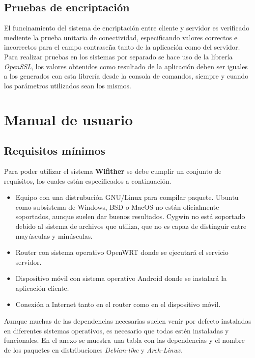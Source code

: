 \documentclass[12pt]{article}
\begin{document}
    \subsection{Pruebas de encriptación}
    El funcinamiento del sistema de encriptación entre cliente y servidor es verificado mediente la prueba unitaria de conectividad, especificando valores correctos e incorrectos para el campo contraseña tanto de la aplicación como del servidor. Para realizar pruebas en los sistemas por separado se hace uso de la librería \textit{OpenSSL}, los valores obtenidos como resultado de la aplicación deben ser iguales a los generados con esta librería desde la consola de comandos, siempre y cuando los parámetros utilizados sean los mismos. 

\section{Manual de usuario} \label{sec:man}
    \subsection{Requisitos mínimos}
        Para poder utilizar el sistema \textbf{Wifither} se debe cumplir un conjunto de requisitos, los cuales están especificados a continuación.

        \begin{itemize}
            \item Equipo con una distrubución GNU/Linux para compilar paquete. Ubuntu como subsistema de Windows, BSD o MacOS no están oficialmente soportados, aunque suelen dar buenos resultados. Cygwin no está soportado debido al sistema de archivos que utiliza, que no es capaz de distinguir entre mayúsculas y minúsculas.
            \item Router con sistema operativo OpenWRT donde se ejecutará el servicio servidor.
            \item Dispositivo móvil con sistema operativo Android donde se instalará la aplicación cliente.
            \item Conexión a Internet tanto en el router como en el dispositivo móvil.
        \end{itemize}

        Aunque muchas de las dependencias necesarias suelen venir por defecto instaladas en diferentes sistemas operativos, es necesario que todas estén instaladas y funcionales. En el anexo  se muestra una tabla con las dependencias y el nombre de los paquetes en distribuciones \textit{Debian-like} y \textit{Arch-Linux}.
\end{document}
